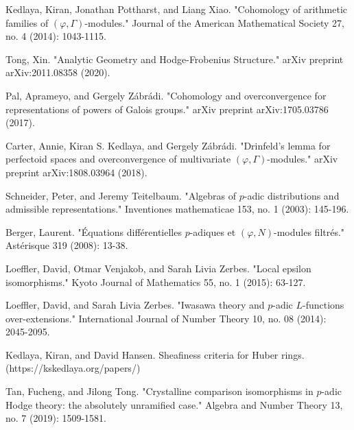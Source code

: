 \documentclass[12pt]{amsart}
\theoremstyle{definition}
\numberwithin{equation}{section}
\begin{document}
\begin{thebibliography}{10}

 Kedlaya, Kiran, Jonathan Pottharst, and Liang Xiao. "Cohomology of arithmetic families of $(\varphi, \Gamma)$-modules." Journal of the American Mathematical Society 27, no. 4 (2014): 1043-1115.

 Tong, Xin. "Analytic Geometry and Hodge-Frobenius Structure." arXiv preprint arXiv:2011.08358 (2020).

 Pal, Aprameyo, and Gergely Z\'abr\'adi. "Cohomology and overconvergence for representations of powers of Galois groups." arXiv preprint arXiv:1705.03786 (2017).

 Carter, Annie, Kiran S. Kedlaya, and Gergely Z\'abr\'adi. "Drinfeld's lemma for perfectoid spaces and overconvergence of multivariate $(\varphi,\Gamma) $-modules." arXiv preprint arXiv:1808.03964 (2018). 

 Schneider, Peter, and Jeremy Teitelbaum. "Algebras of $p$-adic distributions and admissible representations." Inventiones mathematicae 153, no. 1 (2003): 145-196.

 Berger, Laurent. "\'Equations diff\'erentielles $p$-adiques et $(\varphi,N)$-modules filtr\'es." Ast\'erisque 319 (2008): 13-38.


 Loeffler, David, Otmar Venjakob, and Sarah Livia Zerbes. "Local epsilon isomorphisms." Kyoto Journal of Mathematics 55, no. 1 (2015): 63-127.

 Loeffler, David, and Sarah Livia Zerbes. "Iwasawa theory and $p$-adic $L$-functions over-extensions." International Journal of Number Theory 10, no. 08 (2014): 2045-2095.




 Kedlaya, Kiran, and David Hansen. Sheafiness criteria for Huber rings. (https://kskedlaya.org/papers/) 



 Tan, Fucheng, and Jilong Tong. "Crystalline comparison isomorphisms in $p$-adic Hodge theory: the absolutely unramified case." Algebra and Number Theory 13, no. 7 (2019): 1509-1581.



\end{thebibliography}
\end{document}

